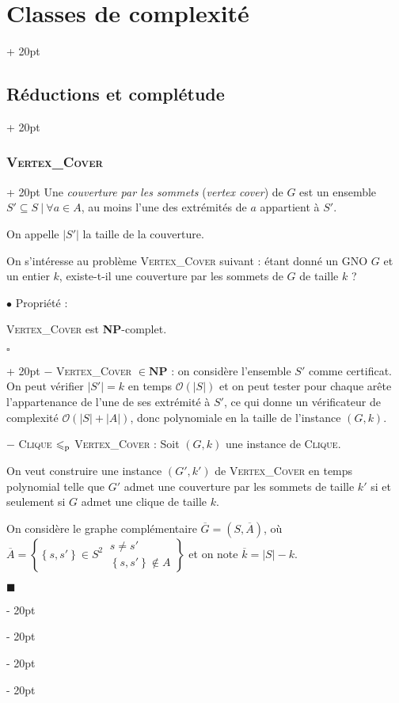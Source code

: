 \documentclass[a4paper, 12pt, twoside]{article}
\newcommand{\cj}[1]{\overline{#1}} %
\newcommand{\set}[1]{\left\{ #1 \right\}}
\newcommand{\abs}[1]{\left\lvert #1 \right\rvert}
\renewcommand{\le}{\leqslant}
\newcommand{\ind}[1][20pt]{\advance\leftskip + #1}
\newcommand{\deind}[1][20pt]{\advance\leftskip - #1}
\newenvironment{indt}[2][20pt]{#2 \par \ind[#1]}{\par \deind} %
\newenvironment{proof}[1][{}]{\begin{indt}{$\square$ #1}}{$\blacksquare$ \end{indt}}
\begin{document}
\begin{indt}{\section{Classes de complexité}}
\begin{indt}{\subsection{Réductions et complétude}}
\begin{indt}{\subsubsection{\textsc{Vertex\_Cover}}}
                Une \emph{couverture par les sommets} (\textit{vertex cover}) de $G$ est un ensemble $S' \subseteq S\ |\ \forall a \in A$, au moins l'une des extrémités de $a$ appartient à $S'$.

                On appelle $\abs{S'}$ la taille de la couverture.

                \vspace{6pt}
                
                On s'intéresse au problème \textsc{Vertex\_Cover} suivant : étant donné un GNO $G$ et un entier $k$, existe-t-il une couverture par les sommets de $G$ de taille $k$ ?

                \vspace{12pt}
                
                $\bullet$ Propriété :
                \begin{emphBox}
                    \textsc{Vertex\_Cover} est \textbf{NP}-complet.
                \end{emphBox}

                \vspace{6pt}
                
                \begin{proof}
                    $-$ \textsc{Vertex\_Cover} $\in \mathbf{NP}$ : on considère l'ensemble $S'$ comme certificat.
                    On peut vérifier $\abs{S'} = k$ en temps $\mathcal O(\abs S)$ et on peut tester pour chaque arête l'appartenance de l'une de ses extrémité à $S'$, ce qui donne un vérificateur de complexité $\mathcal O(\abs S + \abs A)$, donc polynomiale en la taille de l'instance $(G, k)$.

                    \vspace{6pt}
                    
                    $-$ \textsc{Clique} $\le_{\rm p}$ \textsc{Vertex\_Cover} :
                    Soit $(G, k)$ une instance de \textsc{Clique}.

                    On veut construire une instance $(G', k')$ de \textsc{Vertex\_Cover} en temps polynomial telle que $G'$ admet une couverture par les sommets de taille $k'$ si et seulement si $G$ admet une clique de taille $k$.

                    On considère le graphe complémentaire $\cj G = (S, \cj A)$, où
                    $
                        \cj A =
                        \set{
                            \set{s, s'} \in S^2\
                            \begin{array}{|l}
                                s \neq s'
                                \\
                                \set{s, s'} \notin A
                            \end{array}
                        }
                    $
                    et on note $\cj k = \abs S - k$.


\end{proof}
\end{indt}
\end{indt}
\end{indt}
\end{document}

